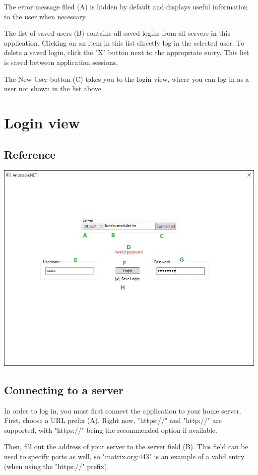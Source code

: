 \documentclass[titlepage]{scrartcl}
\begin{document}
The error message filed (A) is hidden by default and displays useful information to the user when necessary.

The list of saved users (B) contains all saved logins from all servers in this application. Clicking on an item in this list directly log in the selected user. To delete a saved login, click the "X" button next to the appropriate entry. This list is saved between application sessions.

The New User button (C) takes you to the login view, where you can log in as a user not shown in the list above.
\section{Login view}
\subsection{Reference}
\begin{center}
    \includegraphics[width=410pt]{login-window.png}
\end{center}

\subsection{Connecting to a server}
In order to log in, you must first connect the application to your home server. First, choose a URL prefix (A). Right now, "https://" and "http://" are supported, with "https://" being the recommended option if available. 

Then, fill out the address of your server to the server field (B). This field can be used to specify ports as well, so "matrix.org:443" is an example of a valid entry (when using the "https://" prefix). 
\end{document}
